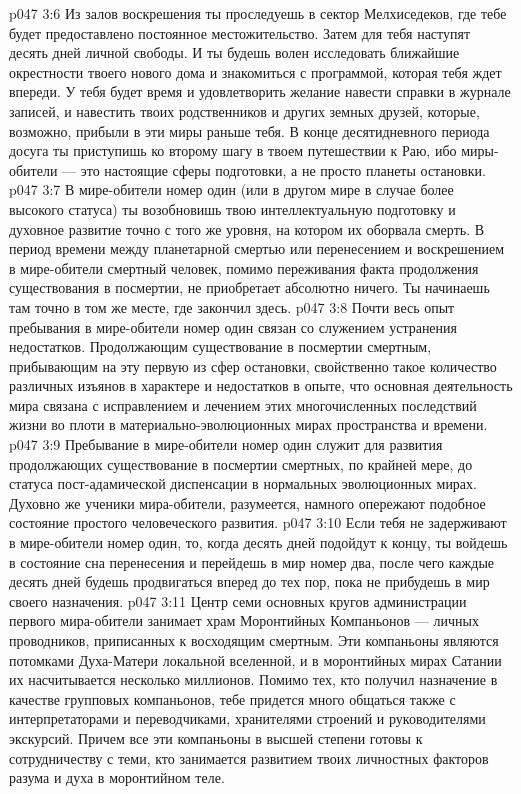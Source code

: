 \vs p047 3:6 \pc Из залов воскрешения ты проследуешь в сектор Мелхиседеков, где тебе будет предоставлено постоянное местожительство. Затем для тебя наступят десять дней личной свободы. И ты будешь волен исследовать ближайшие окрестности твоего нового дома и знакомиться с программой, которая тебя ждет впереди. У тебя будет время и удовлетворить желание навести справки в журнале записей, и навестить твоих родственников и других земных друзей, которые, возможно, прибыли в эти миры раньше тебя. В конце десятидневного периода досуга ты приступишь ко второму шагу в твоем путешествии к Раю, ибо миры\hyp{}обители --- это настоящие сферы подготовки, а не просто планеты остановки.
\vs p047 3:7 \pc В мире\hyp{}обители номер один (или в другом мире в случае более высокого статуса) ты возобновишь твою интеллектуальную подготовку и духовное развитие точно с того же уровня, на котором их оборвала смерть. В период времени между планетарной смертью или перенесением и воскрешением в мире\hyp{}обители смертный человек, помимо переживания факта продолжения существования в посмертии, не приобретает абсолютно ничего. Ты начинаешь там точно в том же месте, где закончил здесь.
\vs p047 3:8 Почти весь опыт пребывания в мире\hyp{}обители номер один связан со служением устранения недостатков. Продолжающим существование в посмертии смертным, прибывающим на эту первую из сфер остановки, свойственно такое количество различных изъянов в характере и недостатков в опыте, что основная деятельность мира связана с исправлением и лечением этих многочисленных последствий жизни во плоти в материально\hyp{}эволюционных мирах пространства и времени.
\vs p047 3:9 Пребывание в мире\hyp{}обители номер один служит для развития продолжающих существование в посмертии смертных, по крайней мере, до статуса пост\hyp{}адамической диспенсации в нормальных эволюционных мирах. Духовно же ученики мира\hyp{}обители, разумеется, намного опережают подобное состояние простого человеческого развития.
\vs p047 3:10 Если тебя не задерживают в мире\hyp{}обители номер один, то, когда десять дней подойдут к концу, ты войдешь в состояние сна перенесения и перейдешь в мир номер два, после чего каждые десять дней будешь продвигаться вперед до тех пор, пока не прибудешь в мир своего назначения.
\vs p047 3:11 \pc Центр семи основных кругов администрации первого мира\hyp{}обители занимает храм Моронтийных Компаньонов --- личных проводников, приписанных к восходящим смертным. Эти компаньоны являются потомками Духа\hyp{}Матери локальной вселенной, и в моронтийных мирах Сатании их насчитывается несколько миллионов. Помимо тех, кто получил назначение в качестве групповых компаньонов, тебе придется много общаться также с интерпретаторами и переводчиками, хранителями строений и руководителями экскурсий. Причем все эти компаньоны в высшей степени готовы к сотрудничеству с теми, кто занимается развитием твоих личностных факторов разума и духа в моронтийном теле.
